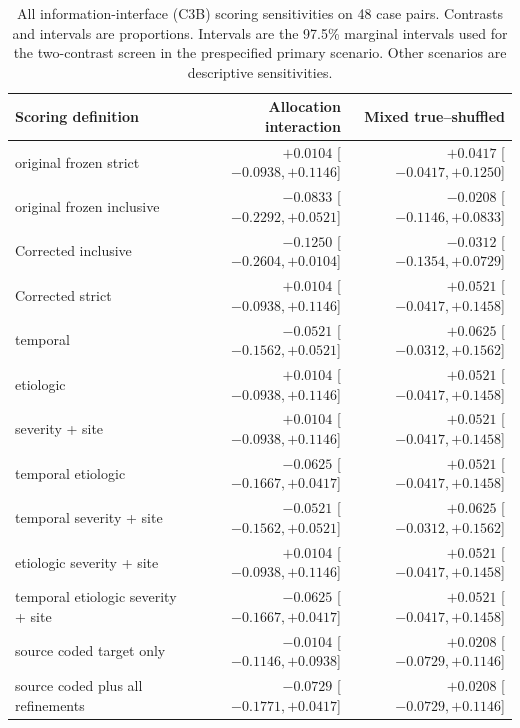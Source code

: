 \begin{table}[ht]\centering\footnotesize
\caption{All information-interface (C3B) scoring sensitivities on 48 case pairs. Contrasts and intervals are proportions. Intervals are the 97.5\% marginal intervals used for the two-contrast screen in the prespecified primary scenario. Other scenarios are descriptive sensitivities.}\label{tab:interfacescenarios}
\begin{tabular}{p{.31\linewidth}rr}\toprule Scoring definition & Allocation interaction & Mixed true--shuffled \\ \midrule
original frozen strict & $+0.0104$ [$ -0.0938, +0.1146 $] & $+0.0417$ [$ -0.0417, +0.1250 $] \\
original frozen inclusive & $-0.0833$ [$ -0.2292, +0.0521 $] & $-0.0208$ [$ -0.1146, +0.0833 $] \\
Corrected inclusive & $-0.1250$ [$ -0.2604, +0.0104 $] & $-0.0312$ [$ -0.1354, +0.0729 $] \\
Corrected strict & $+0.0104$ [$ -0.0938, +0.1146 $] & $+0.0521$ [$ -0.0417, +0.1458 $] \\
temporal & $-0.0521$ [$ -0.1562, +0.0521 $] & $+0.0625$ [$ -0.0312, +0.1562 $] \\
etiologic & $+0.0104$ [$ -0.0938, +0.1146 $] & $+0.0521$ [$ -0.0417, +0.1458 $] \\
severity + site & $+0.0104$ [$ -0.0938, +0.1146 $] & $+0.0521$ [$ -0.0417, +0.1458 $] \\
temporal etiologic & $-0.0625$ [$ -0.1667, +0.0417 $] & $+0.0521$ [$ -0.0417, +0.1458 $] \\
temporal severity + site & $-0.0521$ [$ -0.1562, +0.0521 $] & $+0.0625$ [$ -0.0312, +0.1562 $] \\
etiologic severity + site & $+0.0104$ [$ -0.0938, +0.1146 $] & $+0.0521$ [$ -0.0417, +0.1458 $] \\
temporal etiologic severity + site & $-0.0625$ [$ -0.1667, +0.0417 $] & $+0.0521$ [$ -0.0417, +0.1458 $] \\
source coded target only & $-0.0104$ [$ -0.1146, +0.0938 $] & $+0.0208$ [$ -0.0729, +0.1146 $] \\
source coded plus all refinements & $-0.0729$ [$ -0.1771, +0.0417 $] & $+0.0208$ [$ -0.0729, +0.1146 $] \\
\bottomrule\end{tabular}\end{table}
